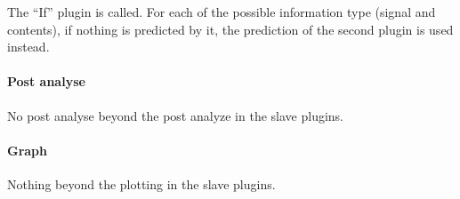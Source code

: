 The ``If'' plugin is called. For each of the possible information type
(signal and contents), if nothing is predicted by it, the prediction
of the second plugin is used instead.

\paragraph{Post analyse}

No post analyse beyond the post analyze in the slave plugins.

\paragraph{Graph}

Nothing beyond the plotting in the slave plugins.


